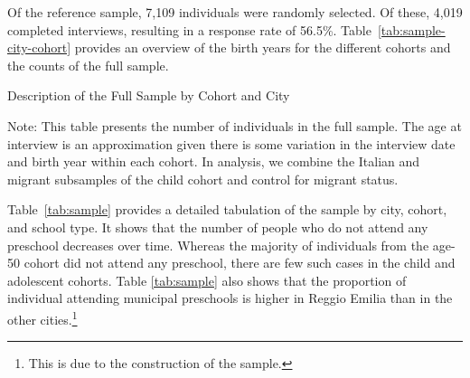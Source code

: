 Of the reference sample, 7,109 individuals were randomly selected. Of these, 4,019 completed interviews, resulting in a response rate of 56.5\%. Table~\ref{tab:sample-city-cohort} provides an overview of the birth years for the different cohorts and the counts of the full sample.
\begin{table}[H]
\centering
\begin{threeparttable}
	\caption{Description of the Full Sample by Cohort and City}\label{tab:sample-city-cohort}
	
\begin{tablenotes}
\footnotesize
Note: This table presents the number of individuals in the full sample. The age at interview is an approximation given there is some variation in the interview date and birth year within each cohort. In analysis, we combine the Italian and migrant subsamples of the child cohort and control for migrant status.
\end{tablenotes}
\end{threeparttable}
\end{table}

Table~\ref{tab:sample} provides a detailed tabulation of the sample by city, cohort, and school type. It shows that the number of people who do not attend any preschool decreases over time. Whereas the majority of individuals from the age-50 cohort did not attend any preschool, there are few such cases in the child and adolescent cohorts. Table \ref{tab:sample} also shows that the proportion of individual attending municipal preschools is higher in Reggio Emilia than in the other cities.\footnote{This is due to the construction of the sample.} 

\begin{table}[H]
\centering
{}
\end{table}

